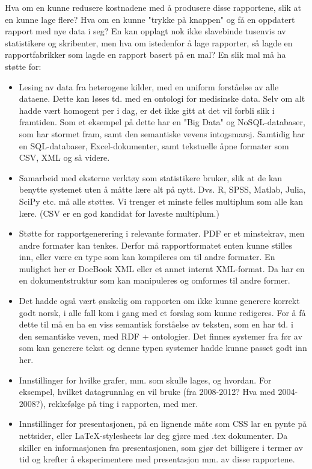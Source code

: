 \documentclass[11pt]{article}
\begin{document}
Hva om en kunne redusere kostnadene med å produsere disse rapportene, slik at en kunne lage flere? Hva om en kunne "trykke på knappen" og få en oppdatert rapport med nye data i seg?
En kan opplagt nok ikke slavebinde tusenvis av statistikere og skribenter, men hva om istedenfor å lage rapporter, så lagde en rapportfabrikker som lagde en rapport basert på en mal?
En slik mal må ha støtte for:
\begin{itemize}
\item Lesing av data fra heterogene kilder, med en uniform forståelse av alle dataene.
  Dette kan løses td. med en ontologi for medisinske data.
  Selv om alt hadde vært homogent per i dag, er det ikke gitt at det vil forbli slik i framtiden.
  Som et eksempel på dette har en "Big Data" og NoSQL-databaser, som har stormet fram, samt den semantiske vevens intogsmarsj. Samtidig har en SQL-databaser, Excel-dokumenter, samt tekstuelle åpne formater som CSV, XML og så videre.
   
\item Samarbeid med eksterne verktøy som statistikere bruker, slik at de kan benytte systemet uten å måtte lære alt på nytt.
  Dvs. R, SPSS, Matlab, Julia, SciPy etc. må alle støttes. Vi trenger et minste felles multiplum som alle kan lære. (CSV\cite{csv} er en god kandidat for laveste multiplum.)
  
\item Støtte for rapportgenerering i relevante formater. PDF er et minstekrav, men andre formater kan tenkes. Derfor må rapportformatet enten kunne stilles inn, eller være en type som kan kompileres om til andre formater.
  En mulighet her er DocBook XML eller et annet internt XML-format. Da har en en dokumentstruktur som kan manipuleres og omformes til andre former.

\item Det hadde også vært ønskelig om rapporten om ikke kunne generere korrekt godt norsk, i alle fall kom i gang med et forslag som kunne redigeres. For å få dette til må en ha en viss semantisk forståelse av teksten, som en har td. i den semantiske veven, med RDF\cite{rdf11primer} + ontologier\cite{damloil}\cite{owlref}. Det finnes systemer fra før av som kan generere tekst og denne typen systemer hadde kunne passet godt inn her.

\item Innstillinger for hvilke grafer, mm. som skulle lages, og hvordan.
  For eksempel, hvilket datagrunnlag en vil bruke (fra 2008-2012? Hva med 2004-2008?), rekkefølge på ting i rapporten, med mer.
  
\item Innstillinger for presentasjonen, på en lignende måte som CSS lar en pynte på nettsider, eller LaTeX-stylesheets lar deg gjøre med .tex dokumenter.
  Da skiller en informasjonen fra presentasjonen, som gjør det billigere i termer av tid og krefter å eksperimentere med presentasjon mm. av disse rapportene.
\end{itemize} 
\end{document}
